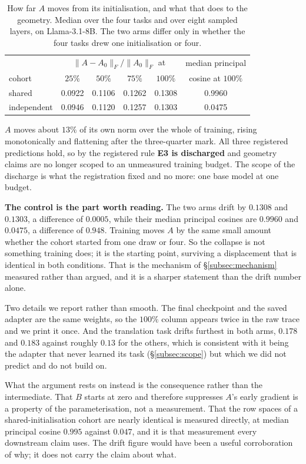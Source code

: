 \begin{table}[htb]
\centering
\small
\caption{How far $A$ moves from its initialisation, and what that does to the
geometry. Median over the four tasks and over eight sampled layers, on
Llama-3.1-8B. The two arms differ only in whether the four tasks drew one
initialisation or four.}
\label{tab:drift}
\begin{tabular}{lccccc}
\toprule
 & \multicolumn{4}{c}{$\|A - A_0\|_F/\|A_0\|_F$ at} &
   median principal \\
cohort & $25\%$ & $50\%$ & $75\%$ & $100\%$ & cosine at $100\%$ \\
\midrule
shared        & 0.0922 & 0.1106 & 0.1262 & 0.1308 & 0.9960 \\
independent   & 0.0946 & 0.1120 & 0.1257 & 0.1303 & 0.0475 \\
\bottomrule
\end{tabular}
\end{table}

$A$ moves about $13\%$ of its own norm over the whole of training, rising
monotonically and flattening after the three-quarter mark. All three
registered predictions hold, so by the registered rule \textbf{E3 is
discharged} and geometry claims are no longer scoped to an unmeasured training
budget. The scope of the discharge is what the registration fixed and no
more: one base model at one budget.

\textbf{The control is the part worth reading.} The two arms drift by
$0.1308$ and $0.1303$, a difference of $0.0005$, while their median principal
cosines are $0.9960$ and $0.0475$, a difference of $0.948$. Training moves $A$
by the same small amount whether the cohort started from one draw or four. So
the collapse is not something training does; it is the starting point,
surviving a displacement that is identical in both conditions. That is the
mechanism of \S\ref{subsec:mechanism} measured rather than argued, and it is a
sharper statement than the drift number alone.

Two details we report rather than smooth. The final checkpoint and the saved
adapter are the same weights, so the $100\%$ column appears twice in the raw
trace and we print it once. And the translation task drifts furthest in both
arms, $0.178$ and $0.183$ against roughly $0.13$ for the others, which is
consistent with it being the adapter that never learned its task
(\S\ref{subsec:scope}) but which we did not predict and do not build on.

What the argument rests on instead is the consequence rather than the
intermediate. That $B$ starts at zero and therefore suppresses $A$'s early
gradient is a property of the parameterisation, not a measurement. That the
row spaces of a shared-initialisation cohort are nearly identical is
measured directly, at median principal cosine $0.995$ against $0.047$, and
it is that measurement every downstream claim uses. The drift figure would
have been a useful corroboration of why; it does not carry the claim about
what.

